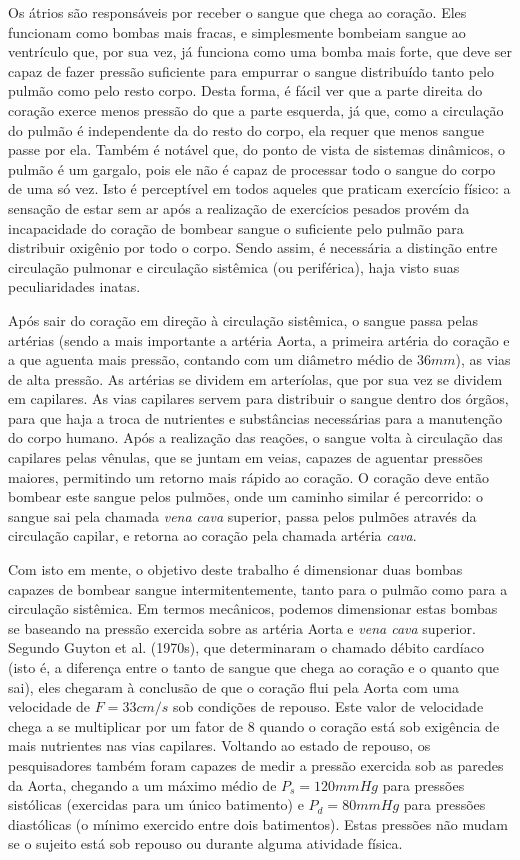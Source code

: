 \documentclass[12pt, a4paper, twoside]{article}
\begin{document}
Os átrios são responsáveis por receber o sangue que chega ao coração. Eles funcionam como bombas mais fracas, e simplesmente bombeiam sangue ao ventrículo que, por sua vez, já funciona como uma bomba mais forte, que deve ser capaz de fazer pressão suficiente para empurrar o sangue distribuído tanto pelo pulmão como pelo resto corpo. Desta forma, é fácil ver que a parte direita do coração exerce menos pressão do que a parte esquerda, já que, como a circulação do pulmão é independente da do resto do corpo, ela requer que menos sangue passe por ela. Também é notável que, do ponto de vista de sistemas dinâmicos, o pulmão é um gargalo, pois ele não é capaz de processar todo o sangue do corpo de uma só vez. Isto é perceptível em todos aqueles que praticam exercício físico: a sensação de estar sem ar após a realização de exercícios pesados provém da incapacidade do coração de bombear sangue o suficiente pelo pulmão para distribuir oxigênio por todo o corpo. Sendo assim, é necessária a distinção entre circulação pulmonar e circulação sistêmica (ou periférica), haja visto suas peculiaridades inatas.

Após sair do coração em direção à circulação sistêmica, o sangue passa pelas artérias (sendo a mais importante a artéria Aorta, a primeira artéria do coração e a que aguenta mais pressão, contando com um diâmetro médio de $36mm$), as vias de alta pressão. As artérias se dividem em arteríolas, que por sua vez se dividem em capilares. As vias capilares servem para distribuir o sangue dentro dos órgãos, para que haja a troca de nutrientes e substâncias necessárias para a manutenção do corpo humano. Após a realização das reações, o sangue volta à circulação das capilares pelas vênulas, que se juntam em veias, capazes de aguentar pressões maiores, permitindo um retorno mais rápido ao coração. O coração deve então bombear este sangue pelos pulmões, onde um caminho similar é percorrido: o sangue sai pela chamada \textit{vena cava} superior, passa pelos pulmões através da circulação capilar, e retorna ao coração pela chamada artéria \textit{cava}.

Com isto em mente, o objetivo deste trabalho é dimensionar duas bombas capazes de bombear sangue intermitentemente, tanto para o pulmão como para a circulação sistêmica. Em termos mecânicos, podemos dimensionar estas bombas se baseando na pressão exercida sobre as artéria Aorta e \textit{vena cava} superior. Segundo Guyton et al. (1970s), que determinaram o chamado débito cardíaco (isto é, a diferença entre o tanto de sangue que chega ao coração e o quanto que sai), eles chegaram à conclusão de que o coração flui pela Aorta com uma velocidade de $F=33cm/s$ sob condições de repouso. Este valor de velocidade chega a se multiplicar por um fator de 8 quando o coração está sob exigência de mais nutrientes nas vias capilares. Voltando ao estado de repouso, os pesquisadores também foram capazes de medir a pressão exercida sob as paredes da Aorta, chegando a um máximo médio de $P_s=120mmHg$ para pressões sistólicas (exercidas para um único batimento) e $P_d=80mmHg$ para pressões diastólicas (o mínimo exercido entre dois batimentos). Estas pressões não mudam se o sujeito está sob repouso ou durante alguma atividade física.
\end{document}
